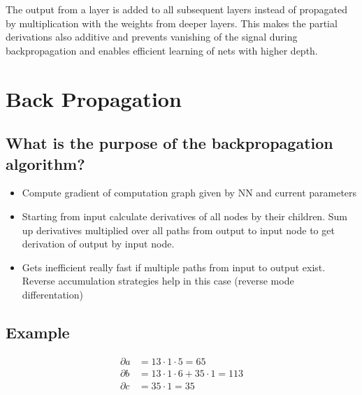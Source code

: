 The output from a layer is added to all subsequent layers instead of propagated by multiplication with the weights from deeper layers. This makes the partial derivations also additive and prevents vanishing of the signal during backpropagation and enables efficient learning of nets with higher depth. 
%
\section{Back Propagation}
\subsection{What is the purpose of the backpropagation algorithm?}
\begin{itemize}
\item { Compute gradient of computation graph given by NN and current parameters}
\item { Starting from input calculate derivatives of all nodes by their children. Sum up derivatives multiplied over all paths from output to input node to get derivation of output by input node. }
\item { Gets inefficient really fast if multiple paths from input to output exist. Reverse accumulation strategies help in this case (reverse mode differentation)}
\end{itemize}
\subsection{Example}
\begin{minipage}{0.6\textwidth}
\end{minipage}\begin{minipage}{0.4\textwidth}
\begin{align*}
\partial a &= 13\cdot 1 \cdot 5 = 65\\
\partial b &=  13\cdot 1 \cdot 6 + 35\cdot 1 = 113\\
\partial c &= 35 \cdot 1 = 35
\end{align*}
\end{minipage}
